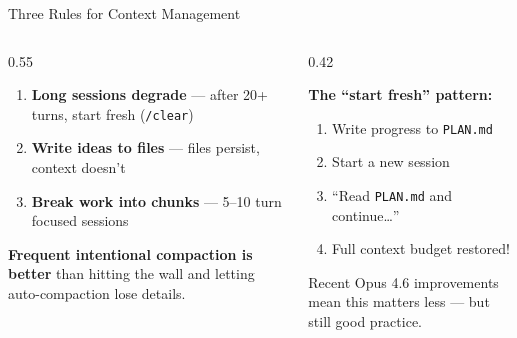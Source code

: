 \documentclass[aspectratio=169, 10pt]{beamer}
\begin{document}
\begin{frame}{Three Rules for Context Management}
\begin{columns}[T]
\begin{column}{0.55\textwidth}
\vskip2pt
\begin{enumerate}\setlength{\itemsep}{6pt}
  \item[\color{SlateTeal}\textbf{1.}] \textbf{Long sessions degrade} --- after 20+ turns, start fresh (\texttt{/clear})
  \pause
  \item[\color{SlateTeal}\textbf{2.}] \textbf{Write ideas to files} --- files persist, context doesn't
  \pause
  \item[\color{SlateTeal}\textbf{3.}] \textbf{Break work into chunks} --- 5--10 turn focused sessions
\end{enumerate}
\vskip8pt
\begin{tcolorbox}[quotebox]
\small \textbf{Frequent intentional compaction is better} than hitting the wall and letting auto-compaction lose details.
\end{tcolorbox}
\end{column}
\begin{column}{0.42\textwidth}
\vskip2pt
\begin{tcolorbox}[accentbox]
\small
\textbf{The ``start fresh'' pattern:}
\vskip2pt
\begin{enumerate}\setlength{\itemsep}{0pt}\small
  \item Write progress to \texttt{PLAN.md}
  \item Start a new session
  \item ``Read \texttt{PLAN.md} and continue\ldots''
  \item Full context budget restored!
\end{enumerate}
\end{tcolorbox}
\vskip4pt
{\scriptsize\color{CoolGray} Recent Opus 4.6 improvements mean this matters less --- but still good practice.}
\end{column}
\end{columns}
\end{frame}
\end{document}

